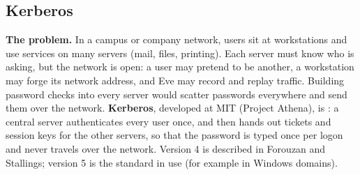 \subsection{Kerberos \hot\new}\label{sec:kerberos}

\textbf{The problem.} In a campus or company network, users sit at workstations and use services on many servers (mail, files, printing). Each server must know who is asking, but the network is open: a user may pretend to be another, a workstation may forge its network address, and Eve may record and replay traffic. Building password checks into every server would scatter passwords everywhere and send them over the network. \textbf{Kerberos}, developed at MIT (Project Athena), is : a central server authenticates every user once, and then hands out tickets and session keys for the other servers, so that the password is typed once per logon and never travels over the network. Version 4 is described in Forouzan and Stallings; version 5 is the standard in use (for example in Windows domains).

